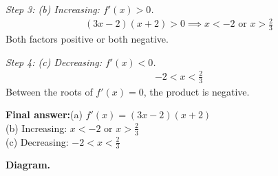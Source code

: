 \documentclass[11pt]{article}
\begin{document}
\textit{Step 3: (b) Increasing: \( f'(x) > 0 \).}
\[\begin{gathered}
(3x-2)(x+2) > 0 \implies x < -2 \text{ or } x > \tfrac{2}{3}
\end{gathered}\]
Both factors positive or both negative.

\textit{Step 4: (c) Decreasing: \( f'(x) < 0 \).}
\[\begin{gathered}
-2 < x < \tfrac{2}{3}
\end{gathered}\]
Between the roots of \( f'(x) = 0 \), the product is negative.

\begin{answerbox}
\textbf{Final answer:}\quad (a) \(\displaystyle  f'(x) = (3x-2)(x+2) \) \\[3pt]  (b) Increasing: \(\displaystyle  x < -2 \) or \(\displaystyle  x > \tfrac{2}{3} \) \\[3pt]  (c) Decreasing: \(\displaystyle  -2 < x < \tfrac{2}{3} \)
\end{answerbox}
\textbf{Diagram.}
\end{document}
